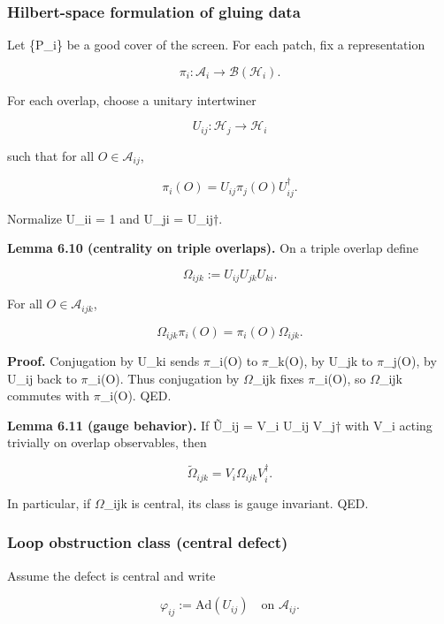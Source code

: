 \subsubsection{Hilbert-space formulation of gluing data}\label{65-hilbert-space-formulation-of-gluing-data}

Let \{P\_i\} be a good cover of the screen. For each patch, fix a representation

\[
\pi_i: \mathcal{A}_i \to \mathcal B(\mathcal H_i).
\]

For each overlap, choose a unitary intertwiner

\[
U_{ij}: \mathcal H_j \to \mathcal H_i
\]

such that for all \(O \in \mathcal{A}_{ij}\),

\[
\pi_i(O) = U_{ij} \pi_j(O) U_{ij}^\dagger.
\]

Normalize U\_ii = 1 and U\_ji = U\_ij\ensuremath{\dagger}.

\textbf{Lemma 6.10 (centrality on triple overlaps).} On a triple overlap define

\[
\Omega_{ijk} := U_{ij} U_{jk} U_{ki}.
\]

For all \(O \in \mathcal{A}_{ijk}\),

\[
\Omega_{ijk} \pi_i(O) = \pi_i(O) \Omega_{ijk}.
\]

\textbf{Proof.} Conjugation by U\_ki sends \ensuremath{\pi}\_i(O) to \ensuremath{\pi}\_k(O), by U\_jk to \ensuremath{\pi}\_j(O), by U\_ij back to \ensuremath{\pi}\_i(O). Thus conjugation by \ensuremath{\Omega}\_ijk fixes \ensuremath{\pi}\_i(O), so \ensuremath{\Omega}\_ijk commutes with \ensuremath{\pi}\_i(O). QED.

\textbf{Lemma 6.11 (gauge behavior).} If \~{U}\_ij = V\_i U\_ij V\_j\ensuremath{\dagger} with V\_i acting trivially on overlap observables, then

\[
\tilde{\Omega}_{ijk} = V_i \Omega_{ijk} V_i^\dagger.
\]

In particular, if \ensuremath{\Omega}\_ijk is central, its class is gauge invariant. QED.

\subsubsection{Loop obstruction class (central defect)}\label{66-loop-obstruction-class-central-defect}

Assume the defect is central and write

\[
\varphi_{ij} := \mathrm{Ad}(U_{ij}) \quad \text{on } \mathcal{A}_{ij}.
\]

